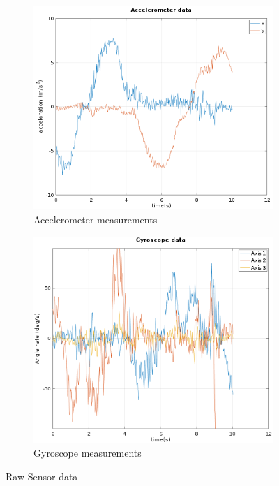\begin{figure}[h]
\centering
\begin{subfigure}[b]{0.45\textwidth}
    \includegraphics[width=\textwidth]{figures/acc_data.png}
    \caption{Accelerometer measurements}
    \label{fig:acc_data}
\end{subfigure}
\begin{subfigure}[b]{0.45\textwidth}
    \includegraphics[width=\textwidth]{figures/gyro_data.png}
    \caption{Gyroscope measurements}
    \label{fig:gyro_data}
\end{subfigure}
\caption{Raw Sensor data}
\label{fig:sensor_data}
\end{figure}


